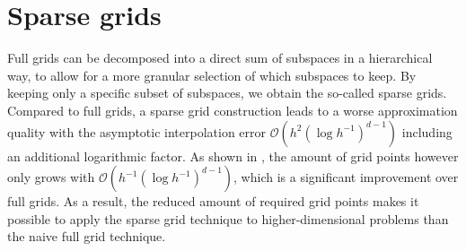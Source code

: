 \documentclass[
  a4paper,  %
  twoside,  %
  bibliography=totoc,
  headsepline,
  cleardoublepage=empty,
  parskip=half,
  draft=false
]{scrbook}
\begin{document}
\section{Sparse grids}

Full grids can be decomposed into a direct sum of subspaces in a hierarchical way, to allow for a more granular selection of which subspaces to keep.
By keeping only a specific subset of subspaces, we obtain the so-called sparse grids.
Compared to full grids, a sparse grid construction leads to a worse approximation quality with the asymptotic interpolation error $\mathcal{O}(h^2 (\log h^{-1})^{d-1})$ including an additional logarithmic factor.
As shown in \cite{Bungartz2004}, the amount of grid points however only grows with $\mathcal{O}(h^{-1} (\log h^{-1})^{d-1})$, which is a significant improvement over full grids.
As a result, the reduced amount of required grid points makes it possible to apply the sparse grid technique to higher-dimensional problems than the naive full grid technique.
\end{document}
